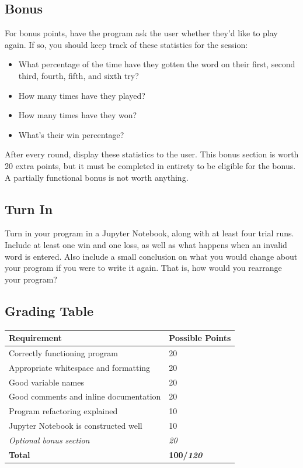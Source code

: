 \subsection*{Bonus}
For bonus points, have the program ask the user whether they'd like to play again. If so, you should keep track of these statistics for the session:
\begin{itemize}
\item What percentage of the time have they gotten the word on their first, second third, fourth, fifth, and sixth try?
\item How many times have they played?
\item How many times have they won?
\item What's their win percentage?
\end{itemize}
After every round, display these statistics to the user. This bonus section is worth 20 extra points, but it must be completed in entirety to be eligible for the bonus. A partially functional bonus is not worth anything.
\subsection*{Turn In}
Turn in your program in a Jupyter Notebook, along with at least four trial runs. Include at least one win and one loss, as well as what happens when an invalid word is entered. Also include a small conclusion on what you would change about your program if you were to write it again. That is, how would you rearrange your program?
\subsection*{Grading Table}
\begin{tabular}{|l|l|}
\hline
Requirement & Possible Points \\ \hline
Correctly functioning program & 20 \\ \hline
Appropriate whitespace and formatting & 20 \\ \hline
Good variable names & 20 \\ \hline
Good comments and inline documentation & 20 \\ \hline
Program refactoring explained & 10 \\ \hline
Jupyter Notebook is constructed well & 10 \\ \hline
\textit{Optional bonus section} & \textit{20} \\\hline
\textbf{Total} & \textbf{100/\textit{120}} \\ \hline
\end{tabular}

